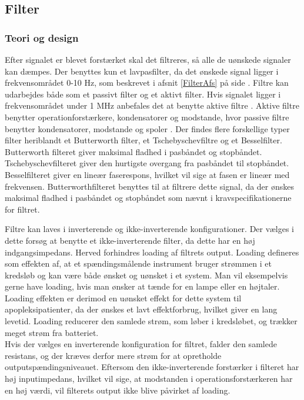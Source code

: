 \subsection{Filter}
\subsubsection{Teori og design}
Efter signalet er blevet forstærket skal det filtreres, så alle de uønskede signaler kan dæmpes. Der benyttes kun et lavpasfilter, da det ønskede signal ligger i frekvensområdet 0-10 Hz, som beskrevet i afsnit \ref{FilterAfs} på side \pageref{FilterAfs}. Filtre kan udarbejdes både som et passivt filter og et aktivt filter. Hvis signalet ligger i frekvensområdet under 1 MHz anbefales det at benytte aktive filtre \cite{Carter2013}. Aktive filtre benytter operationforstærkere, kondensatorer og modstande, hvor passive filtre benytter kondensatorer, modstande og spoler \cite{Carter2013}. Der findes flere forskellige typer filter heriblandt et Butterworth filter, et Tschebyschevfiltre og et Besselfilter. Butterworth filteret giver maksimal fladhed i pasbåndet og stopbåndet. Tschebyschevfilteret giver den hurtigste overgang fra pasbåndet til stopbåndet. Besselfilteret giver en lineær faserespons, hvilket vil sige at fasen er lineær med frekvensen. \cite{Carter2013} Butterworthfilteret benyttes til at filtrere dette signal, da der ønskes maksimal fladhed i pasbåndet og stopbåndet som nævnt i kravspecifikationerne for filtret.

Filtre kan laves i inverterende og ikke-inverterende konfigurationer. Der vælges i dette forsøg at benytte et ikke-inverterende filter, da dette har en høj indgangsimpedans. Herved forhindres loading af filtrets output. Loading defineres som effekten af, at et spændingsmålende instrument bruger strømmen i et kredsløb og kan være både ønsket og uønsket i et system. Man vil eksempelvis gerne have loading, hvis man ønsker at tænde for en lampe eller en højtaler. Loading effekten er derimod en uønsket effekt for dette system til apopleksipatienter, da der ønskes et lavt effektforbrug, hvilket giver en lang levetid. Loading reducerer den samlede strøm, som løber i kredsløbet, og trækker meget strøm fra batteriet. \\
Hvis der vælges en inverterende konfiguration for filtret, falder den samlede resistans, og der kræves derfor mere strøm for at opretholde outputspændingsniveauet. Eftersom den ikke-inverterende forstærker i filteret har høj inputimpedans, hvilket vil sige, at modstanden i operationsforstærkeren har en høj værdi, vil filterets output ikke blive påvirket af loading. \cite{Webster2009,Carter2013,Karni2014}

